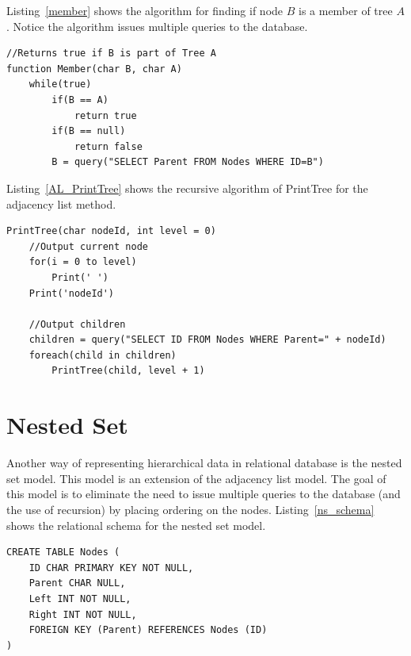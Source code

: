 Listing~\ref{member} shows the algorithm for finding if node $B$ is a member of tree $A$. Notice the algorithm issues multiple queries to the database.

\begin{lstlisting}[frame=single]
//Returns true if B is part of Tree A
function Member(char B, char A)
	while(true)
		if(B == A)
			return true
		if(B == null)
			return false
		B = query("SELECT Parent FROM Nodes WHERE ID=B")
\end{lstlisting}

Listing~\ref{AL_PrintTree} shows the recursive algorithm of PrintTree for the adjacency list method.

\begin{minipage}{\linewidth}
\begin{lstlisting}[frame=single]
PrintTree(char nodeId, int level = 0)
	//Output current node
	for(i = 0 to level)
		Print(' ')
	Print('nodeId')
	
	//Output children
	children = query("SELECT ID FROM Nodes WHERE Parent=" + nodeId)
	foreach(child in children)
		PrintTree(child, level + 1)
\end{lstlisting}	
\end{minipage}

\section{Nested Set}\label{sec-nested-set}

Another way of representing hierarchical data in relational database is the nested set model\cite{journals/trj/Kamfonas92}. This model is an extension of the adjacency list model. The goal of this model is to eliminate the need to issue multiple queries to the database (and the use of recursion) by placing ordering on the nodes. Listing~\ref{ns_schema} shows the relational schema for the nested set model.

\begin{minipage}{\linewidth}
\begin{lstlisting}[frame=single]
CREATE TABLE Nodes (
    ID CHAR PRIMARY KEY NOT NULL,
    Parent CHAR NULL,
    Left INT NOT NULL,
    Right INT NOT NULL,
    FOREIGN KEY (Parent) REFERENCES Nodes (ID)
)
\end{lstlisting}	
\end{minipage}

